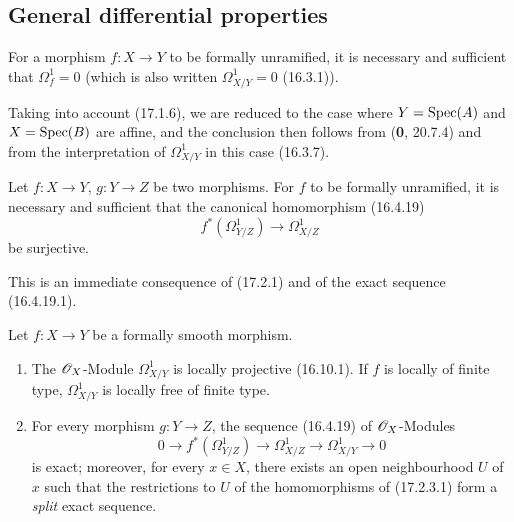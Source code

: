\subsection{General differential properties}

\begin{proposition}[17.2.1]
\label{IV.17.2.1}
For a morphism $f:X\to Y$ to be formally unramified, it is necessary and sufficient that $\varOmega_f^1=0$ \textup{(which is also written $\varOmega_{X/Y}^1=0$ (16.3.1))}.
\end{proposition}

Taking into account (17.1.6), we are reduced to the case where $Y=\operatorname{Spec}(A)$ and $X=\operatorname{Spec}(B)$ are affine, and the conclusion then follows from (\textbf{0}, 20.7.4) and from the interpretation of $\varOmega_{X/Y}^1$ in this case (16.3.7).

\begin{corollary}[17.2.2]
\label{IV.17.2.2}
Let $f:X\to Y$, $g:Y\to Z$ be two morphisms. For $f$ to be formally unramified, it is necessary and sufficient that the canonical homomorphism \textup{(16.4.19)}
\[
  f^*(\varOmega_{Y/Z}^1)\longrightarrow\varOmega_{X/Z}^1
\]
be surjective.
\end{corollary}

This is an immediate consequence of (17.2.1) and of the exact sequence (16.4.19.1).

\begin{proposition}[17.2.3]
\label{IV.17.2.3}
Let $f:X\to Y$ be a formally smooth morphism.
\begin{enumerate}
  \item[\textup{(i)}] The $\mathscr{O}_X$-Module $\varOmega_{X/Y}^1$ is locally projective \textup{(16.10.1)}. If $f$ is locally of finite type, $\varOmega_{X/Y}^1$ is locally free of finite type.
  \item[\textup{(ii)}] For every morphism $g:Y\to Z$, the sequence \textup{(16.4.19)} of $\mathscr{O}_X$-Modules
  \[
  \label{IV.17.2.3.1}
    0\longrightarrow f^*(\varOmega_{Y/Z}^1)\longrightarrow\varOmega_{X/Z}^1\longrightarrow\varOmega_{X/Y}^1\longrightarrow0
    \tag{17.2.3.1}
  \]
  is exact; moreover, for every $x\in X$, there exists an open neighbourhood $U$ of $x$ such that the restrictions to $U$ of the homomorphisms of (17.2.3.1) form a \emph{split} exact sequence.
\end{enumerate}
\end{proposition}

